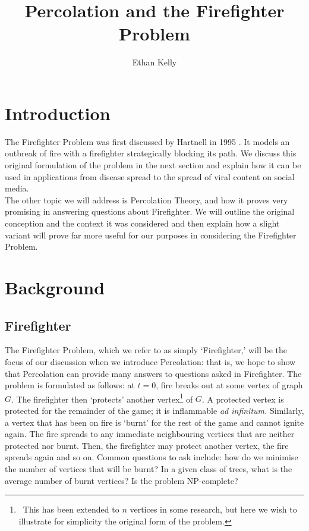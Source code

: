 \documentclass[11pt]{amsart}
\title{Percolation and the Firefighter Problem}
\author{Ethan Kelly}\\Supervisor: Dr Jessica Enright}
\begin{document}
\maketitle

\section{Introduction}
\label{sec:intro}

The Firefighter Problem was first discussed by Hartnell in 1995 \cite{hartnell95}. It models an outbreak of fire with a firefighter strategically blocking its path. We discuss this original formulation of the problem in the next section and explain how it can be used in applications from disease spread to the spread of viral content on social media.\\

The other topic we will address is Percolation Theory, and how it proves very promising in answering questions about Firefighter. We will outline the original conception and the context it was considered and then explain how a slight variant will prove far more useful for our purposes in considering the Firefighter Problem.


\section{Background}

\subsection{Firefighter}

The Firefighter Problem, which we refer to as simply `Firefighter,' will be the focus of our discussion when we introduce Percolation: that is, we hope to show that Percolation can provide many answers to questions asked in Firefighter. The problem is formulated as follows: at $t=0$, fire breaks out at some vertex of graph $G$. The firefighter then `protects' another vertex\footnote{\, This has been extended to $n$ vertices in some research, but here we wish to illustrate for simplicity the original form of the problem.} of $G$. A protected vertex is protected for the remainder of the game; it is inflammable \textit{ad infinitum.} Similarly, a vertex that has been on fire is `burnt' for the rest of the game and cannot ignite again. The fire spreads to any immediate neighbouring vertices that are neither protected nor burnt. Then, the firefighter may protect another vertex, the fire spreads again and so on. Common questions to ask include: how do we minimise the number of vertices that will be burnt? In a given class of trees, what is the average number of burnt vertices? Is the problem NP-complete?\\
\end{document}
